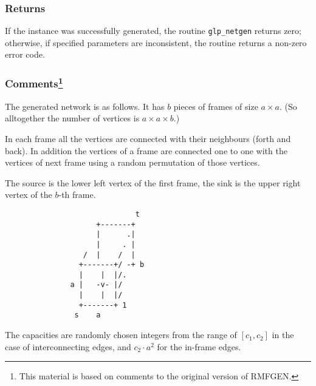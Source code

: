 \subsubsection*{Returns}

If the instance was successfully generated, the routine
\verb|glp_netgen| returns zero; otherwise, if specified parameters are
inconsistent, the routine returns a non-zero error code.

\newpage

\subsubsection*{Comments\footnote{This material is based on comments
to the original version of RMFGEN.}}

The generated network is as follows. It has $b$ pieces of frames of
size $a\times a$. (So alltogether the number of vertices is
$a\times a\times b$.)

In each frame all the vertices are connected with their neighbours
(forth and back). In addition the vertices of a frame are connected
one to one with the vertices of next frame using a random permutation
of those vertices.

The source is the lower left vertex of the first frame, the sink is
the upper right vertex of the $b$-th frame.

\begin{verbatim}
                              t
                     +-------+
                     |      .|
                     |     . |
                  /  |    /  |
                 +-------+/ -+ b
                 |    |  |/.
               a |   -v- |/
                 |    |  |/
                 +-------+ 1
                s    a
\end{verbatim}

The capacities are randomly chosen integers from the range of
$[c_1,c_2]$  in the case of interconnecting edges, and $c_2\cdot a^2$
for the in-frame edges.

